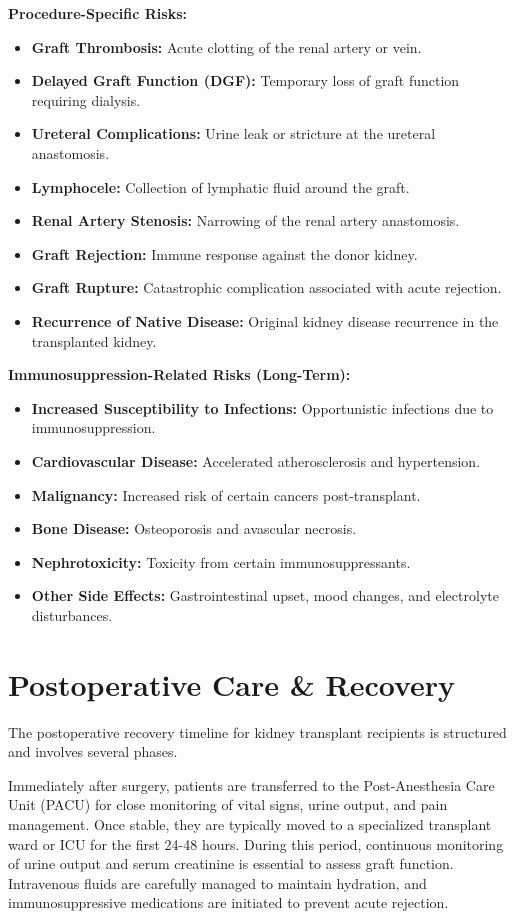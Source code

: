\textbf{Procedure-Specific Risks:}
\begin{itemize}
  \item \textbf{Graft Thrombosis:} Acute clotting of the renal artery or vein.
  \item \textbf{Delayed Graft Function (DGF):} Temporary loss of graft function requiring dialysis.
  \item \textbf{Ureteral Complications:} Urine leak or stricture at the ureteral anastomosis.
  \item \textbf{Lymphocele:} Collection of lymphatic fluid around the graft.
  \item \textbf{Renal Artery Stenosis:} Narrowing of the renal artery anastomosis.
  \item \textbf{Graft Rejection:} Immune response against the donor kidney.
  \item \textbf{Graft Rupture:} Catastrophic complication associated with acute rejection.
  \item \textbf{Recurrence of Native Disease:} Original kidney disease recurrence in the transplanted kidney.
\end{itemize}

\textbf{Immunosuppression-Related Risks (Long-Term):}
\begin{itemize}
  \item \textbf{Increased Susceptibility to Infections:} Opportunistic infections due to immunosuppression.
  \item \textbf{Cardiovascular Disease:} Accelerated atherosclerosis and hypertension.
  \item \textbf{Malignancy:} Increased risk of certain cancers post-transplant.
  \item \textbf{Bone Disease:} Osteoporosis and avascular necrosis.
  \item \textbf{Nephrotoxicity:} Toxicity from certain immunosuppressants.
  \item \textbf{Other Side Effects:} Gastrointestinal upset, mood changes, and electrolyte disturbances.
\end{itemize}

\section*{Postoperative Care \& Recovery}
The postoperative recovery timeline for kidney transplant recipients is structured and involves several phases. 

Immediately after surgery, patients are transferred to the Post-Anesthesia Care Unit (PACU) for close monitoring of vital signs, urine output, and pain management. Once stable, they are typically moved to a specialized transplant ward or ICU for the first 24-48 hours. During this period, continuous monitoring of urine output and serum creatinine is essential to assess graft function. Intravenous fluids are carefully managed to maintain hydration, and immunosuppressive medications are initiated to prevent acute rejection.

